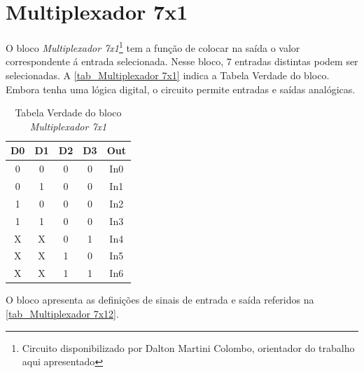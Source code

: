 \renewcommand{\NomeBloco}{\emph{Multiplexador 7x1}}
\renewcommand{\NomeBlocoNoIt}{Multiplexador 7x1}
\renewcommand{\NomePTab}{tab_\NomeBlocoNoIt}
\renewcommand{\NomeSTab}{tab_\NomeBlocoNoIt2}
\renewcommand{\NomePFig}{fig_\NomeBlocoNoIt}
\renewcommand{\NomeSFig}{fig_\NomeBlocoNoIt2}
\renewcommand{\NomeTTab}{tab_\NomeBlocoNoIt3}

\section{Multiplexador 7x1}

O bloco \NomeBloco{}\footnote{Circuito disponibilizado por Dalton Martini Colombo, orientador do trabalho aqui apresentado} tem a função de colocar na sa\'ida o valor correspondente \'a entrada selecionada. Nesse bloco, 7 entradas distintas podem ser selecionadas. A \autoref{\NomePTab} indica a Tabela Verdade do bloco. Embora tenha uma l\'ogica digital, o circuito permite entradas e sa\'idas anal\'ogicas.

\begin{table}[htbp]

\caption{Tabela Verdade do bloco \NomeBloco}%
\label{\NomePTab}
\centering
\begin{tabular}{ccccc}
    \toprule
    D0 & D1 & D2 & D3 & Out \\
    \midrule \midrule
    0 & 0 & 0 & 0 & In0 \\
    \midrule
    0 & 1 & 0 & 0 & In1 \\
    \midrule
    1 & 0 & 0 & 0 & In2 \\
    \midrule
    1 & 1 & 0 & 0 & In3 \\
    \midrule
    X & X & 0 & 1 & In4 \\
    \midrule
    X & X & 1 & 0 & In5 \\
    \midrule
    X & X & 1 & 1 & In6 \\
\bottomrule

\end{tabular}
\end{table}

O bloco apresenta as definições de sinais de entrada e sa\'ida referidos na \autoref{\NomeSTab}.

